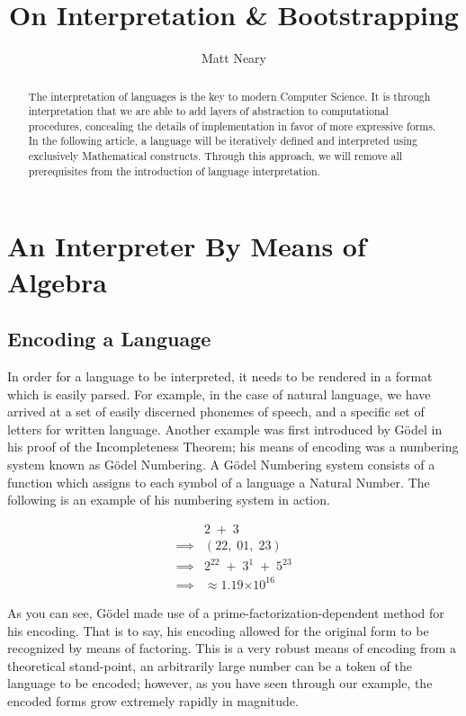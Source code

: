 \documentclass{article}
\providecommand{\e}[1]{\ensuremath{\times 10^{#1}}}
\begin{document}
\begin{titlepage}
\title{On Interpretation \& Bootstrapping}
\author{Matt Neary}
\maketitle
\begin{abstract}
The interpretation of languages is the key to modern Computer Science. It is through interpretation
that we are able to add layers of abstraction to computational procedures, concealing the details of
implementation in favor of more expressive forms. In the following article, a language will be 
iteratively defined and interpreted using exclusively Mathematical constructs. Through this approach,
we will remove all prerequisites from the introduction of language interpretation.
\end{abstract}
\thispagestyle{empty}
\end{titlepage}

\section{An Interpreter By Means of Algebra}
\subsection{Encoding a Language}
In order for a language to be interpreted, it needs to be rendered in a format which is easily
parsed. For example, in the case of natural language, we have arrived at a set of easily discerned
phonemes of speech, and a specific set of letters for written language. Another example was first
introduced by G\"odel in his proof of the Incompleteness Theorem; his means of encoding was a
numbering system known as G\"odel Numbering. A G\"odel Numbering system consists of a function
which assigns to each symbol of a language a Natural Number. The following is an example of his 
numbering system in action.

\begin{align*}
    &2 \; + \; 3
\\ \implies &(22, \; 01, \; 23)
\\ \implies &2^{22} \; + \; 3^{1} \; + \; 5^{23}
\\ \implies &\approx 1.19\e{16}
\end{align*}

As you can see, G\"odel made use of a prime-factorization-dependent method for his encoding. That is
to say, his encoding allowed for the original form to be recognized by means of factoring. This is a
very robust means of encoding from a theoretical stand-point, an arbitrarily large number can be a
token of the language to be encoded; however, as you have seen through our example, the encoded forms
grow extremely rapidly in magnitude.
\end{document}
